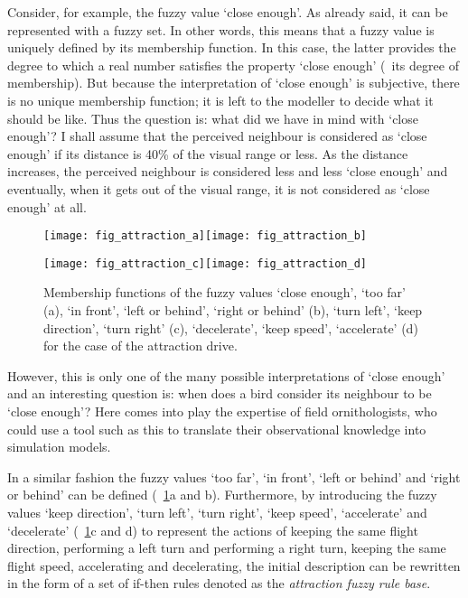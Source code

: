 Consider, for example, the fuzzy value `close enough'. As already said, it can be represented with a fuzzy set. In other words, this means that a fuzzy value is uniquely defined by its membership function. In this case, the latter provides the degree to which a real number satisfies the property `close enough' (\ie\ its degree of membership). But because the interpretation of `close enough' is subjective, there is no unique membership function; it is left to the modeller to decide what it should be like. Thus the question is: what did we have in mind with `close enough'? I shall assume that the perceived neighbour is considered as `close enough' if its distance is 40\% of the visual range or less. As the distance increases, the perceived neighbour is considered less and less `close enough' and eventually, when it gets out of the visual range, it is not considered as `close enough' at all. 
%
\begin{figure}
	\null\vspace*{2mm}\par
	\texttt{[image: fig\_attraction\_a]}\hspace*{2mm}\texttt{[image: fig\_attraction\_b]}
	\par\vspace*{2mm}
	\texttt{[image: fig\_attraction\_c]}\hspace*{2mm}\texttt{[image: fig\_attraction\_d]}
	\par\vspace*{2mm}
	\caption{Membership functions of the fuzzy values `close enough', `too far' (a), `in front', `left or behind', `right or behind' (b), `turn left', `keep direction', `turn right' (c), `decelerate', `keep speed', `accelerate' (d) for the case of the attraction drive.}
	\label{fig:fuzzyAnimat:Da:afd}
\end{figure}
%
However, this is only one of the many possible interpretations of `close enough' and an interesting question is: when does a bird consider its neighbour to be `close enough'? Here comes into play the expertise of field ornithologists, who could use a tool such as this to translate their observational knowledge into simulation models.

In a similar fashion the fuzzy values `too far', `in front', `left or behind' and `right or behind' can be defined (\figs~\ref{fig:fuzzyAnimat:Da:afd}a and b). Furthermore, by introducing the fuzzy values `keep direction', `turn left', `turn right', `keep speed', `accelerate' and `decelerate' (\figs~\ref{fig:fuzzyAnimat:Da:afd}c and d) to represent the actions of keeping the same flight direction, performing a left turn and performing a right turn, keeping the same flight speed, accelerating and decelerating, the initial description can be rewritten in the form of a set of if-then rules denoted as the \emph{attraction fuzzy rule base}.

